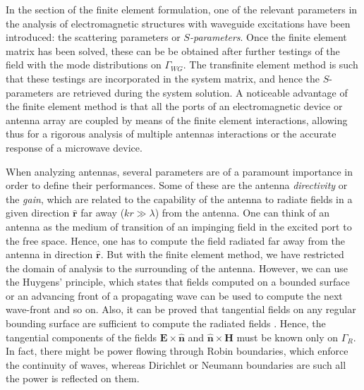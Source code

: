 In the section of the finite element formulation, one of the relevant parameters in the analysis of electromagnetic structures with waveguide excitations have been introduced: the scattering parameters or \textit{$S$-parameters}. Once the finite element matrix has been solved, these can be be obtained after further testings of the field with the mode distributions on $\Gamma_{WG}$. The transfinite element method is such that these testings are incorporated in the system matrix, and hence the $S$-parameters are retrieved during the system solution. A noticeable advantage of the finite element method is that all the ports of an electromagnetic device or antenna array are coupled by means of the finite element interactions, allowing thus for a rigorous analysis of multiple antennas interactions or the accurate response of a microwave device.

When analyzing antennas, several parameters are of a paramount importance in order to define their performances. Some of these are the antenna \textit{directivity} or the \textit{gain}, which are related to the capability of the antenna to radiate fields in a given direction $\hat{\mathbf{r}}$ far away ($kr\gg\lambda$) from the antenna. One can think of an antenna as the medium of transition of an impinging field in the excited port to the free space. Hence, one has to compute the field radiated far away from the antenna in direction $\hat{\mathbf{r}}$. But with the finite element method, we have restricted the domain of analysis to the surrounding of the antenna. However, we can use the Huygens' principle, which states that fields computed on a bounded surface or an advancing front of a propagating wave can be used to compute the next wave-front and so on. Also, it can be proved that tangential fields on any regular bounding surface are sufficient to compute the radiated fields \cite{rothwell2009electromagnetics}. Hence, the tangential components of the fields $\mathbf{E}\times\hat{\mathbf{n}}$ and $\hat{\mathbf{n}}\times\mathbf{H}$ must be known only on $\Gamma_R$. In fact, there might be power flowing through Robin boundaries, which enforce the continuity of waves, whereas Dirichlet or Neumann boundaries are such all the power is reflected on them.

